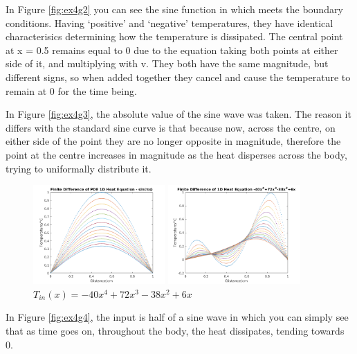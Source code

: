 \documentclass[11pt,a4paper]{article}
\begin{document}
\vspace{3mm}In Figure \ref{fig:ex4g2} you can see the sine function in which meets the boundary conditions. Having `positive' and `negative' temperatures, they have identical characterisics determining how the temperature is dissipated. The central point at x = 0.5 remains equal to 0 due to the equation taking both points at either side of it, and multiplying with v. They both have the same magnitude, but different signs, so when added together they cancel and cause the temperature to remain at 0 for the time being.

\vspace{3mm}In Figure \ref{fig:ex4g3}, the absolute value of the sine wave was taken. The reason it differs with the standard sine curve is that because now, across the centre, on either side of the point they are no longer opposite in magnitude, therefore the point at the centre increases in magnitude as the heat disperses across the body, trying to uniformally distribute it.

\pagebreak

\begin{figure}
	\includegraphics[width=0.45\textwidth]{Ex4_Figs/sinpi.png}
	\vspace{-3mm}
	\caption{$T_{in}(x)= sin(\pi x)$}
	\label{fig:ex4g4}
		\includegraphics[width=0.45\textwidth]{Ex4_Figs/poly.png}
		\vspace{-3mm}
	\caption{$T_{in}(x)= -40x^4 +72x^3 -38x^2 +6x$}
	\label{fig:ex4g5}
\end{figure}

In Figure \ref{fig:ex4g4}, the input is half of a sine wave in which you can simply see that as time goes on, throughout the body, the heat dissipates, tending towards 0.
\end{document}
